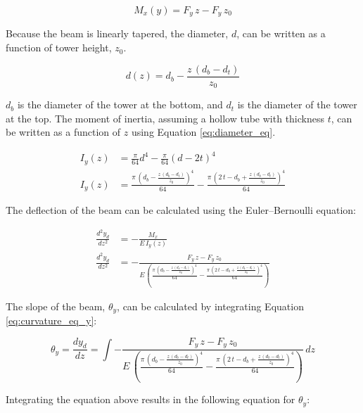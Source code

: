 \begin{equation} \label{eq:moment}
	M_x(y) = F_{y}\,z-F_{y}\,z_{0}
\end{equation}

Because the beam is linearly tapered, the diameter, $d$, can be written as a function of tower height, $z_0$.

\begin{equation} \label{eq:diameter_eq}
	d(z) = d_{b}-\frac{z\,\left(d_{b}-d_{t}\right)}{z_{0}}
\end{equation}

$d_b$ is the diameter of the tower at the bottom, and $d_t$ is the diameter of the tower at the top.  The moment of inertia, assuming a hollow tube with thickness $t$, can be written as a function of $z$ using Equation \ref{eq:diameter_eq}.

\begin{align}
	I_y(z) &= \frac{\pi}{64}d^4 - \frac{\pi}{64}\left(d-2t \right)^4 \\
	I_y(z) &= \frac{\pi \,{\left(d_{b}-\frac{z\,\left(d_{b}-d_{t}\right)}{z_{0}}\right)}^4}{64}-\frac{\pi \,{\left(2\,t-d_{b}+\frac{z\,\left(d_{b}-d_{t}\right)}{z_{0}}\right)}^4}{64} \label{eq:y_moment_intertia}
\end{align}

The deflection of the beam can be calculated using the Euler–Bernoulli equation:

\begin{align}
	\frac{d^2 y_d}{dz^2} &= -\frac{M_x}{E\,I_y(z)} \\
	\frac{d^2 y_d}{dz^2} &= -\frac{F_{y}\,z-F_{y}\,z_{0}}{E\,\left(\frac{\pi \,{\left(d_{b}-\frac{z\,\left(d_{b}-d_{t}\right)}{z_{0}}\right)}^4}{64}-\frac{\pi \,{\left(2\,t-d_{b}+\frac{z\,\left(d_{b}-d_{t}\right)}{z_{0}}\right)}^4}{64}\right)}
 \label{eq:curvature_eq_y}
\end{align}

The slope of the beam, $\theta_y$, can be calculated by integrating Equation \ref{eq:curvature_eq_y}:

\begin{equation}
	\theta_y = \frac{dy_d}{dz} = \int{-\frac{F_{y}\,z-F_{y}\,z_{0}}{E\,\left(\frac{\pi \,{\left(d_{b}-\frac{z\,\left(d_{b}-d_{t}\right)}{z_{0}}\right)}^4}{64}-\frac{\pi \,{\left(2\,t-d_{b}+\frac{z\,\left(d_{b}-d_{t}\right)}{z_{0}}\right)}^4}{64}\right)}\,dz}
\end{equation}

Integrating the equation above results in the following equation for $\theta_y$:

